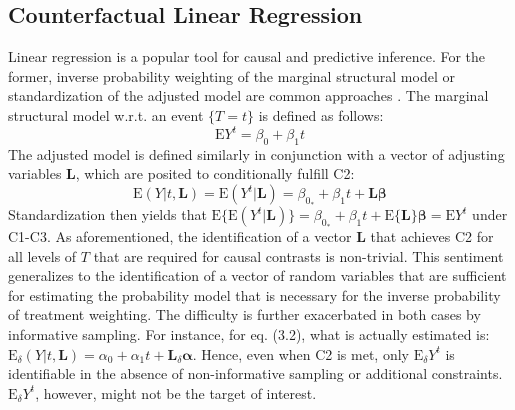 \documentclass[12pt]{amsart}
\theoremstyle{plain}%
\theoremstyle{definition}
\theoremstyle{remark}
\numberwithin{equation}{section}
\begin{document}
\subsection{Counterfactual Linear Regression}
Linear regression is a popular tool for causal and predictive inference. For the former, inverse probability weighting of the marginal structural model or standardization of the adjusted model are common approaches \cite{hernan2010causal, hernan2006estimating, imbens2004nonparametric, mansournia2016inverse}. The marginal structural model w.r.t. an event $\{ T=t \}$ is defined as follows:
\begin{equation}
\text{E}Y^t = \beta_0 + \beta_1 t
\end{equation}
The adjusted model is defined similarly in conjunction with a vector of adjusting variables $\mathbf{L}$, which are posited to conditionally fulfill C2:
\begin{equation}
\text{E}(Y|t, \mathbf{L})= \text{E}(Y^{t}| \mathbf{L}) = \beta_{0_*} + \beta_1 t + \mathbf{L}\boldsymbol{\beta}
\end{equation}
Standardization then yields that $\text{E}\{ \text{E}(Y^{t}| \mathbf{L}) \} = \beta_{0_*} + \beta_1 t + \text{E} \{ \mathbf{L} \} \boldsymbol{\beta} = \text{E}Y^t$ under C1-C3. As aforementioned, the identification of a vector $\mathbf{L}$ that achieves C2 for all levels of $T$ that are required for causal contrasts is non-trivial. This sentiment generalizes to the identification of a vector of random variables that are sufficient for estimating the probability model that is necessary for the inverse probability of treatment weighting. The difficulty is further exacerbated in both cases by informative sampling. For instance, for eq. (3.2), what is actually estimated is: $\text{E}_{\delta}(Y|t, \mathbf{L}) = \alpha_0 + \alpha_1 t + \mathbf{L}_{\delta}\boldsymbol{\alpha}$. Hence, even when C2 is met, only $\text{E}_{\delta}Y^t$ is identifiable in the absence of non-informative sampling or additional constraints. $\text{E}_{\delta}Y^t$, however, might not be the target of interest. 
\end{document}
